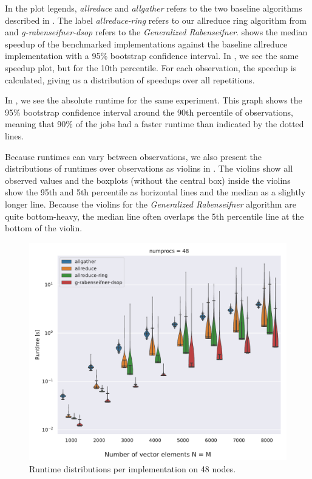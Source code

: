 \documentclass[letterpaper]{article}
\newcommand{\grabenseifner}{\textit{Generalized Rabenseifner}}
\begin{document}
In the plot legends, \textit{allreduce} and \textit{allgather} refers to the two baseline algorithms described in .
The label \textit{allreduce-ring} refers to our allreduce ring algorithm from  and \textit{g-rabenseifner-dsop} refers to the \grabenseifner{}.
 shows the median speedup of the benchmarked implementations against the baseline allreduce implementation with a 95\% bootstrap confidence interval.
In , we see the same speedup plot, but for the 10th percentile. For each observation, the speedup is calculated, giving us a distribution of speedups over all repetitions.



In , we see the absolute runtime for the same experiment. This graph shows the 95\% bootstrap confidence interval around the 90th percentile of observations, meaning that 90\% of the jobs had a faster runtime than indicated by the dotted lines.



Because runtimes can vary between observations, we also present the distributions of runtimes over observations as violins in . The violins show all observed values and the boxplots (without the central box) inside the violins show the 95th and 5th percentile as horizontal lines and the median as a slightly longer line. Because the violins for the \grabenseifner{} algorithm are quite bottom-heavy, the median line often overlaps the 5th percentile line at the bottom of the violin.

\begin{figure}[t]
    \centering
    \includegraphics[width=0.95\columnwidth]{plots/cmp_numprocs_48_log_scale.pdf}
    \caption{Runtime distributions per implementation on 48 nodes.}
    \label{fig:runtime-violin-48-log}
\end{figure}
\end{document}
